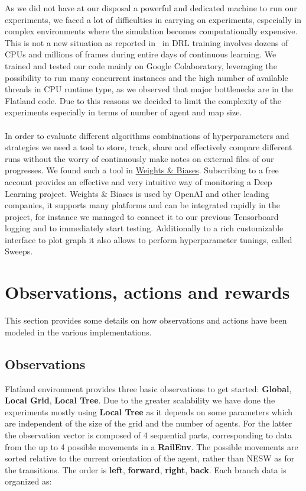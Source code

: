 \documentclass[11pt, a4paper, hidelinks]{report}
\begin{document}
As we did not have at our disposal a powerful and dedicated machine to run our experiments, we faced a lot of difficulties in carrying on experiments, especially in complex environments where the simulation becomes computationally expensive.
This is not a new situation as reported in~\citep{Hernandez-Leal-2019} in DRL training involves dozens of CPUs and millions of frames during entire days of continuous learning.
We trained and tested our code mainly on Google Colaboratory, leveraging the possibility to run many concurrent instances and the high number of available threads in CPU runtime type, as we observed that major bottlenecks are in the Flatland code.
Due to this reasons we decided to limit the complexity of the experiments especially in terms of number of agent and map size.\\%
\\
In order to evaluate different algorithms combinations of hyperparameters and strategies we need a tool to store, track, share and effectively compare different runs without the worry of continuously make notes on external files of our progresses.
We found such a tool in \href{https://www.wandb.com/}{Weights \& Biases}.
Subscribing to a free account provides an effective and very intuitive way of monitoring a Deep Learning project.
Weights \& Biases is used by OpenAI and other leading companies, it supports many platforms and can be integrated rapidly in the project, for instance we managed to connect it to our previous Tensorboard logging and to immediately start testing.
Additionally to a rich customizable interface to plot graph it also allows to perform hyperparameter tunings, called Sweeps.

\section{Observations, actions and rewards}\label{sec:observations,-actions-and-rewards}

This section provides some details on how observations and actions have been modeled in the various implementations.

\subsection{Observations}\label{subsec:observations}

Flatland environment provides three basic observations to get started: \textbf{Global}, \textbf{Local Grid}, \textbf{Local Tree}.
Due to the greater scalability we have done the experiments mostly using \textbf{Local Tree} as it depends on some parameters which are independent of the size of the grid and the number of agents.
For the latter the observation vector is composed of 4 sequential parts, corresponding to data from the up to 4 possible movements in a \textbf{RailEnv}.
The possible movements are sorted relative to the current orientation of the agent, rather than NESW as for the transitions.
The order is \textbf{left}, \textbf{forward}, \textbf{right}, \textbf{back}.
Each branch data is organized as:
\end{document}
